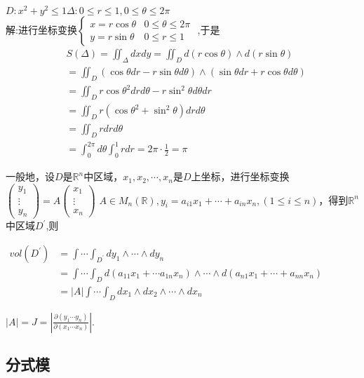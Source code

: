 \documentclass[UTF8]{article}
\begin{document}
\qquad$D:x^{2}+y^{2}\leq 1$\qquad\qquad\qquad\qquad $\Delta:0\leq r\leq 1,0\leq \theta\leq 2\pi$ \\
解:进行坐标变换$\left\{\begin{array}{ll}
x=r\cos\theta&0\leq\theta\leq2\pi\\
y=r\sin\theta&0\leq r\leq1
\end{array}\right.$
,于是
\[\begin{split}
&S(\Delta)=\iint_\Delta dxdy=\iint_D d(r\cos\theta)\land d(r\sin\theta)\\
&=\iint_D(\cos\theta dr-r\sin\theta d\theta)\land(\sin\theta dr+r\cos\theta d\theta)\\
&=\iint_D r\cos\theta^2 drd\theta-r\sin^2\theta d\theta dr\\
&=\iint_D r(\cos\theta^2+\sin^2\theta)drd\theta\\
&=\iint_D rdrd\theta\\
&=\int_{0}^{2\pi}d\theta\int_{0}^{1}rdr=2\pi\cdot\frac{1}{2}=\pi
\end{split}
\]

一般地，设$D$是$\mathbb{R}^{n}$中区域，$x_{1},x_{2},\cdots,x_{n}$是$D$上坐标，进行坐标变换
$\left(\begin{array}{l}
y_{1}\\
\vdots\\
y_n
\end{array}\right)=A\left(\begin{array}{l}
x_{1}\\
\vdots\\
x_n
\end{array}\right)$
$A\in M_n(\mathbb{R}), y_i=a_{i1}x_1+\cdots+a_{in}x_n, (1\leq i\leq n)$，得到$\mathbb{R}^{n}$中区域$D^{'}$,则
\begin{center}
	$\begin{aligned}
	vol(D^{\prime})&=\int\cdots\int_{D^{'}} dy_1\land\cdots\land dy_n\\
	&=\int\cdots\int_D d(a_{11}x_1+\cdots a_{1n}x_n)\land\cdots\land d(a_{n1}x_1+\cdots+a_{nn}x_n)\\
	&=|A|\int\cdots\int_Ddx_1\land dx_2\land\cdots\land dx_n
	\end{aligned}$
\end{center}
$|A|=J=\left|\frac{\partial(y_1\cdots y_n)}{\partial(x_1\cdots x_n)}\right|.$\\

\subsection{分式模}
\end{document}
